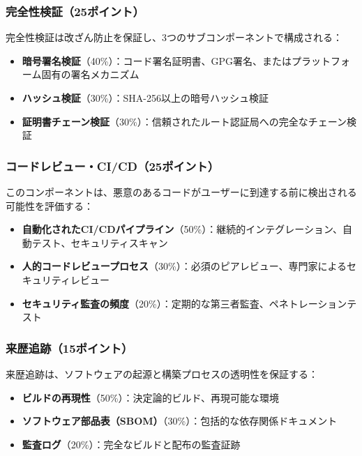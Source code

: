 \documentclass[Specialissue]{jsaiart}
\begin{document}
\subsubsection{完全性検証（25ポイント）}

完全性検証は改ざん防止を保証し、3つのサブコンポーネントで構成される：

\begin{itemize}
    \item \textbf{暗号署名検証}（40\%）：コード署名証明書、GPG署名、またはプラットフォーム固有の署名メカニズム
    \item \textbf{ハッシュ検証}（30\%）：SHA-256以上の暗号ハッシュ検証
    \item \textbf{証明書チェーン検証}（30\%）：信頼されたルート認証局への完全なチェーン検証
\end{itemize}

\subsubsection{コードレビュー・CI/CD（25ポイント）}

このコンポーネントは、悪意のあるコードがユーザーに到達する前に検出される可能性を評価する：

\begin{itemize}
    \item \textbf{自動化されたCI/CDパイプライン}（50\%）：継続的インテグレーション、自動テスト、セキュリティスキャン
    \item \textbf{人的コードレビュープロセス}（30\%）：必須のピアレビュー、専門家によるセキュリティレビュー
    \item \textbf{セキュリティ監査の頻度}（20\%）：定期的な第三者監査、ペネトレーションテスト
\end{itemize}

\subsubsection{来歴追跡（15ポイント）}

来歴追跡は、ソフトウェアの起源と構築プロセスの透明性を保証する：

\begin{itemize}
    \item \textbf{ビルドの再現性}（50\%）：決定論的ビルド、再現可能な環境
    \item \textbf{ソフトウェア部品表（SBOM）}（30\%）：包括的な依存関係ドキュメント
    \item \textbf{監査ログ}（20\%）：完全なビルドと配布の監査証跡
\end{itemize}
\end{document}
